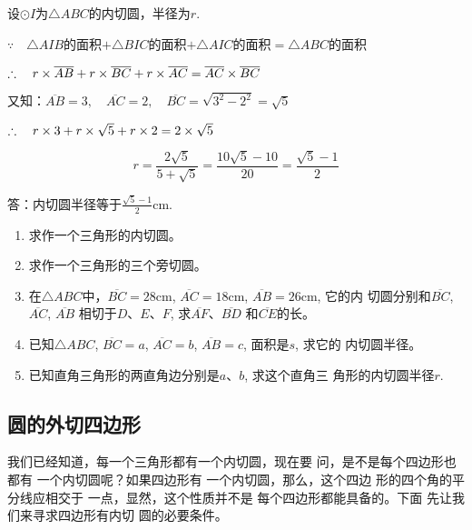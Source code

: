   \begin{solution}
    设$\odot I$为$\triangle ABC$的内切圆，半径为$r$.
  
  $\because\quad \triangle AIB$的面积$+\triangle BIC$的面积$+\triangle AIC$的面积$=\triangle ABC$的面积
  
  $\therefore\quad r\times \overline{AB}+r\times \overline{BC}+r\times \overline{AC}=\overline{AC}\times \overline{BC}$
  
  又知：$\overline{AB}=3,\quad \overline{AC}=2,\quad \overline{BC}=\sqrt{3^2-2^2}=\sqrt{5}$
  
  $\therefore\quad r\times 3+r\times \sqrt{5}+r\times 2=2\times \sqrt{5}$
  
  \[r=\frac{2\sqrt{5}}{5+\sqrt{5}}=\frac{10\sqrt{5}-10}{20}=\frac{\sqrt{5}-1}{2}\]
  
  答：内切圆半径等于$\frac{\sqrt{5}-1}{2}$cm.
  \end{solution}

\begin{ex}
\begin{enumerate}
    \item 求作一个三角形的内切圆。
    \item 求作一个三角形的三个旁切圆。
    \item 在$\triangle ABC$中，$\overline{BC}=28$cm, $\overline{AC}=18$cm, $\overline{AB}=26$cm, 它的内
    切圆分别和$\overline{BC}$, $\overline{AC}$, $\overline{AB}$
    相切于$D$、$E$、$F$, 求$\overline{AF}$、$\overline{BD}$
    和$\overline{CE}$的长。
    \item 已知$\triangle ABC$, $\overline{BC}=a$, $\overline{AC}=b$, $\overline{AB}=c$, 面积是$s$, 求它的
    内切圆半径。
    \item 已知直角三角形的两直角边分别是$a$、$b$, 求这个直角三
    角形的内切圆半径$r$.
\end{enumerate}
\end{ex}

\subsection{圆的外切四边形}

我们已经知道，每一个三角形都有一个内切圆，现在要
问，是不是每个四边形也都有
一个内切圆呢？如果四边形有
一个内切圆，那么，这个四边
形的四个角的平分线应相交于
一点，显然，这个性质并不是
每个四边形都能具备的。下面
先让我们来寻求四边形有内切
圆的必要条件。

\begin{figure}[htp]
    \centering
{}
    \caption{}
\end{figure}


